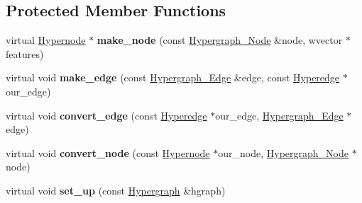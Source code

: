 \subsection*{Protected Member Functions}
\begin{DoxyCompactItemize}
\item 
\hypertarget{classScarab_1_1HG_1_1HypergraphImpl_af14198ba5fccb5d4118188fa42feb8ff}{
virtual \hyperlink{classScarab_1_1HG_1_1Hypernode}{Hypernode} $\ast$ {\bfseries make\_\-node} (const \hyperlink{classHypergraph__Node}{Hypergraph\_\-Node} \&node, wvector $\ast$features)}
\label{classScarab_1_1HG_1_1HypergraphImpl_af14198ba5fccb5d4118188fa42feb8ff}

\item 
\hypertarget{classScarab_1_1HG_1_1HypergraphImpl_a238a7ce3b578c8126eccbc7803570638}{
virtual void {\bfseries make\_\-edge} (const \hyperlink{classHypergraph__Edge}{Hypergraph\_\-Edge} \&edge, const \hyperlink{classScarab_1_1HG_1_1Hyperedge}{Hyperedge} $\ast$our\_\-edge)}
\label{classScarab_1_1HG_1_1HypergraphImpl_a238a7ce3b578c8126eccbc7803570638}

\item 
\hypertarget{classScarab_1_1HG_1_1HypergraphImpl_a30349aca0e3b8f8dc72ed74d78e8c5b8}{
virtual void {\bfseries convert\_\-edge} (const \hyperlink{classScarab_1_1HG_1_1Hyperedge}{Hyperedge} $\ast$our\_\-edge, \hyperlink{classHypergraph__Edge}{Hypergraph\_\-Edge} $\ast$edge)}
\label{classScarab_1_1HG_1_1HypergraphImpl_a30349aca0e3b8f8dc72ed74d78e8c5b8}

\item 
\hypertarget{classScarab_1_1HG_1_1HypergraphImpl_a93e9e250fa457a2171bf07241b7829eb}{
virtual void {\bfseries convert\_\-node} (const \hyperlink{classScarab_1_1HG_1_1Hypernode}{Hypernode} $\ast$our\_\-node, \hyperlink{classHypergraph__Node}{Hypergraph\_\-Node} $\ast$node)}
\label{classScarab_1_1HG_1_1HypergraphImpl_a93e9e250fa457a2171bf07241b7829eb}

\item 
\hypertarget{classScarab_1_1HG_1_1HypergraphImpl_ae91de73e633e450b01664e3ec964019c}{
virtual void {\bfseries set\_\-up} (const \hyperlink{classHypergraph}{Hypergraph} \&hgraph)}
\label{classScarab_1_1HG_1_1HypergraphImpl_ae91de73e633e450b01664e3ec964019c}

\end{DoxyCompactItemize}
